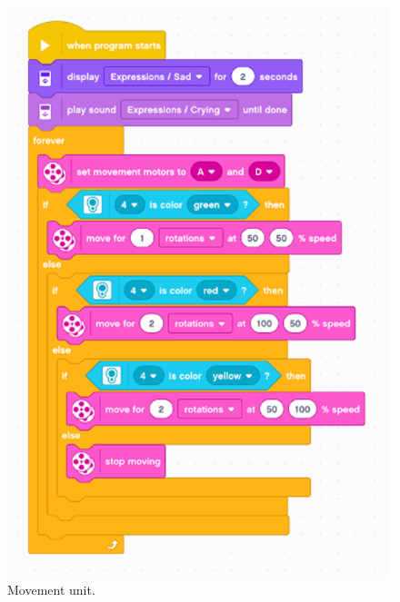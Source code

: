 \documentclass[english]{textolivre}
\begin{document}
\begin{figure}[h!]
\centering
\begin{minipage}{.5\textwidth}
 \includegraphics[width=\textwidth]{Fig1.png}
 \caption{Movement unit.}
 \label{fig01}
\end{minipage}
\end{figure}
\end{document}
